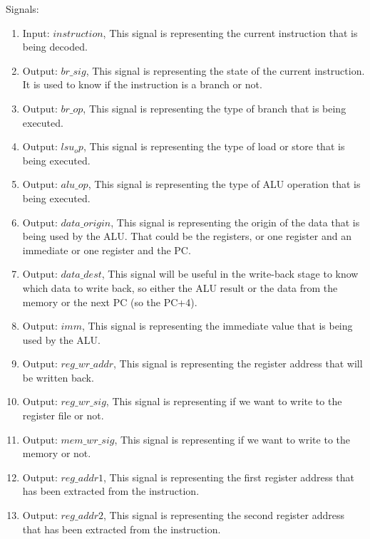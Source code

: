 Signals:
\begin{enumerate}
    \item Input: $instruction$, This signal is representing the current instruction that is being decoded.
    \item Output: $br\_sig$, This signal is representing the state of the current instruction. 
    It is used to know if the instruction is a branch or not.
    \item Output: $br\_op$, This signal is representing the type of branch that is being executed.
    \item Output: $lsu_op$, This signal is representing the type of load or store that is being executed.
    \item Output: $alu\_op$, This signal is representing the type of ALU operation that is being executed.
    \item Output: $data\_origin$, This signal is representing the origin of the data that is being used by the ALU.
    That could be the registers, or one register and an immediate or one register and the PC.
    \item Output: $data\_dest$, This signal will be useful in the write-back stage to know which data to write back,
    so either the ALU result or the data from the memory or the next PC (so the PC+4).
    \item Output: $imm$, This signal is representing the immediate value that is being used by the ALU.
    \item Output: $reg\_wr\_addr$, This signal is representing the register address that will be written back.
    \item Output: $reg\_wr\_sig$, This signal is representing if we want to write to the register file or not.
    \item Output: $mem\_wr\_sig$, This signal is representing if we want to write to the memory or not.
    \item Output: $reg\_addr1$, This signal is representing the first register address that has been extracted from the instruction.
    \item Output: $reg\_addr2$, This signal is representing the second register address that has been extracted from the instruction.
\end{enumerate}